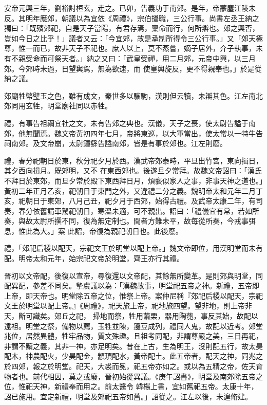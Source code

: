 \begin{pinyinscope}
 安帝元興三年，劉裕討桓玄，走之。已卯，告義功于南郊。是年，帝蒙塵江陵未反。其明年應郊，朝議以為宜依《周禮》，宗伯攝職，三公行事。尚書左丞王納之獨曰：「既殯郊祀，自是天子當陽，有君存焉，稟命而行，何所辯也。郊之興否，豈如今日之比乎！」議者又云：「今宜郊，故是承制所得令三公行事。」又「郊天極尊，惟一而已，故非天子不祀也。庶人以上，莫不蒸嘗，嫡子居外，介子執事，未有不親受命而可祭天者。」納之又曰：「武皇受禪，用二月郊，元帝中興，以三月郊。今郊時未過，日望輿駕，無為欲速，而
 使皇輿旋反，更不得親奉也。」於是從納之議。



 郊廟牲幣璧玉之色，雖有成文，秦世多以騮駒，漢則但云犢，未辯其色。江左南北郊同用玄牲，明堂廟社同以赤牲。



 禮，有事告祖禰宜社之文，未有告郊之典也。漢儀，天子之喪，使太尉告謚于南郊，他無聞焉。魏文帝黃初四年七月，帝將東巡，以大軍當出，使太常以一特牛告祠南郊。及文帝崩，太尉鐘繇告謚南郊，皆是有事於郊也。江左則廢。



 禮，春分祀朝日於東，秋分祀夕月於西。漢武帝郊泰畤，平旦出竹宮，東向揖日，其夕西向揖月。既郊明，又不
 在東西郊也。後遂旦夕常拜。故魏文帝詔曰：「漢氏不拜日於東郊，而旦夕常於殿下東西拜日月，煩褻似家人之事，非事天神之道也。」黃初二年正月乙亥，祀朝日于東門之外，又違禮二分之義。魏明帝太和元年二月丁亥，祀朝日于東郊，八月己丑，祀夕月于西郊，始得古禮。及武帝太康二年，有司奏，春分依舊請車駕祀朝日，寒溫未適，可不親出。詔曰：「禮儀宜有常，若如所奏，與故太尉所撰不同，復為無定制也。間者方難未平，故每從所奏，今戎事弭息，惟此為大。」案
 此詔，帝復為親祀朝日也。此後廢。



 禮，「郊祀后稷以配天，宗祀文王於明堂以配上帝。」魏文帝即位，用漢明堂而未有配。明帝太和元年，始宗祀文帝於明堂，齊王亦行其禮。



 晉初以文帝配，後復以宣帝，尋復還以文帝配，其餘無所變革。是則郊與明堂，同配異配，參差不同矣。摯虞議以為：「漢魏故事，明堂祀五帝之神。新禮，五帝即上帝，即天帝也。明堂除五帝之位，惟祭上帝。案仲尼稱『郊祀后稷以配天，宗祀文王於明堂以配上帝。』《周禮》，祀天旅上帝，祀地旅四望。望非地，則上帝非天，斷可識矣。郊丘之祀，
 掃地而祭，牲用繭栗，器用陶匏，事反其始，故配以遠祖。明堂之祭，備物以薦，玉牲並陳，籩豆成列，禮同人鬼，故配以近考。郊堂兆位，居然異體，牲牢品物，質文殊趣。且祖考同配，非謂尊嚴之美，三日再祀，非謂不黷之義，其非一神，亦足明矣。昔在上古，生為明王，沒則配五行，故太昊配木，神農配火，少昊配金，顓頊配水，黃帝配土。此五帝者，配天之神，同兆之於四郊，報之於明堂。祀天，大裘而冕，祀五帝亦如之。或以為五精之帝，佐天育物者也。前代相因，莫之或廢，晉初始從異議。《庚午詔書》，明堂及南郊除五帝之位，惟祀天神，新禮奉而用之。前太醫令
 韓楊上書，宜如舊祀五帝。太康十年，詔已施用。宜定新禮，明堂及郊祀五帝如舊。」詔從之。江左以後，未遑脩建。




\end{pinyinscope}
